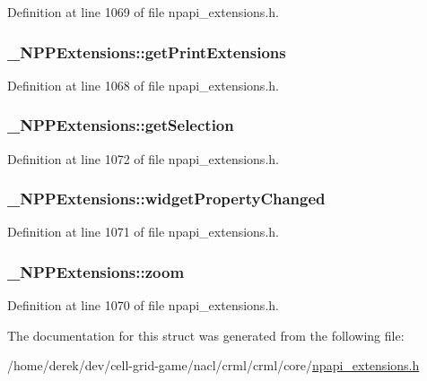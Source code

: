 Definition at line 1069 of file npapi\_\-extensions.h.

\hypertarget{struct___n_p_p_extensions_a21ea206ff20cb3c897fcb11fa262b3b4}{
\subsubsection[{getPrintExtensions}]{ {\bf \_\-NPPExtensions::getPrintExtensions}}}
\label{struct___n_p_p_extensions_a21ea206ff20cb3c897fcb11fa262b3b4}


Definition at line 1068 of file npapi\_\-extensions.h.

\hypertarget{struct___n_p_p_extensions_aa0cff5c427406f7438b7442c69840a78}{
\subsubsection[{getSelection}]{ {\bf \_\-NPPExtensions::getSelection}}}
\label{struct___n_p_p_extensions_aa0cff5c427406f7438b7442c69840a78}


Definition at line 1072 of file npapi\_\-extensions.h.

\hypertarget{struct___n_p_p_extensions_a5d699ab8f68df471355fb5f63f2ad763}{
\subsubsection[{widgetPropertyChanged}]{ {\bf \_\-NPPExtensions::widgetPropertyChanged}}}
\label{struct___n_p_p_extensions_a5d699ab8f68df471355fb5f63f2ad763}


Definition at line 1071 of file npapi\_\-extensions.h.

\hypertarget{struct___n_p_p_extensions_a7fd866d61d275480af61b5d949b5a52d}{
\subsubsection[{zoom}]{ {\bf \_\-NPPExtensions::zoom}}}
\label{struct___n_p_p_extensions_a7fd866d61d275480af61b5d949b5a52d}


Definition at line 1070 of file npapi\_\-extensions.h.



The documentation for this struct was generated from the following file:\begin{DoxyCompactItemize}
\item 
/home/derek/dev/cell-\/grid-\/game/nacl/crml/crml/core/\hyperlink{npapi__extensions_8h}{npapi\_\-extensions.h}\end{DoxyCompactItemize}
